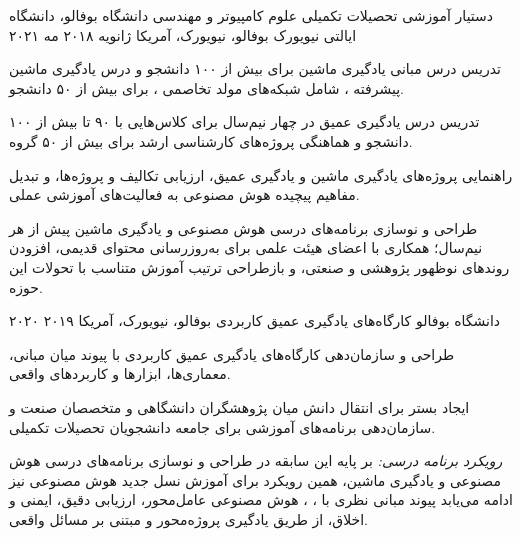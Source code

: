 
\begin{cventries}

\cventry
{دستیار آموزشی تحصیلات تکمیلی  علوم کامپیوتر و مهندسی}
{دانشگاه بوفالو، دانشگاه ایالتی نیویورک}
{بوفالو، نیویورک، آمریکا}
{ژانویه ۲۰۱۸  مه ۲۰۲۱}
{%
\begin{cvitems}
\item {تدریس درس مبانی یادگیری ماشین  برای بیش از ۱۰۰ دانشجو و درس یادگیری ماشین پیشرفته ، شامل شبکه‌های مولد تخاصمی ، برای بیش از ۵۰ دانشجو.}
\item {تدریس درس یادگیری عمیق  در چهار نیم‌سال برای کلاس‌هایی با ۹۰ تا بیش از ۱۰۰ دانشجو و هماهنگی پروژه‌های کارشناسی ارشد برای بیش از ۵۰ گروه.}
\item {راهنمایی پروژه‌های یادگیری ماشین و یادگیری عمیق، ارزیابی تکالیف و پروژه‌ها، و تبدیل مفاهیم پیچیده هوش مصنوعی به فعالیت‌های آموزشی عملی.}
\item {طراحی و نوسازی برنامه‌های درسی هوش مصنوعی و یادگیری ماشین پیش از هر نیم‌سال؛ همکاری با اعضای هیئت علمی برای به‌روزرسانی محتوای قدیمی، افزودن روندهای نوظهور پژوهشی و صنعتی، و بازطراحی ترتیب آموزش متناسب با تحولات این حوزه.}
\end{cvitems}%
}

\cventry
{  دانشگاه بوفالو}
{کارگاه‌های یادگیری عمیق کاربردی}
{بوفالو، نیویورک، آمریکا}
{۲۰۱۹  ۲۰۲۰}
{%
\begin{cvitems}
\item {طراحی و سازمان‌دهی کارگاه‌های یادگیری عمیق کاربردی با پیوند میان مبانی، معماری‌ها، ابزارها و کاربردهای واقعی.}
\item {ایجاد بستر برای انتقال دانش میان پژوهشگران دانشگاهی و متخصصان صنعت و سازمان‌دهی برنامه‌های آموزشی برای جامعه دانشجویان تحصیلات تکمیلی.}
\end{cvitems}%
}

\begin{cvparagraph}
{\textit{رویکرد برنامه درسی:} بر پایه این سابقه در طراحی و نوسازی برنامه‌های درسی هوش مصنوعی و یادگیری ماشین، همین رویکرد برای آموزش نسل جدید هوش مصنوعی نیز ادامه می‌یابد \lr{--} پیوند مبانی نظری با ، ، هوش مصنوعی عامل‌محور، ارزیابی دقیق، ایمنی و اخلاق، از طریق یادگیری پروژه‌محور و مبتنی بر مسائل واقعی.}
\end{cvparagraph}

\end{cventries}
